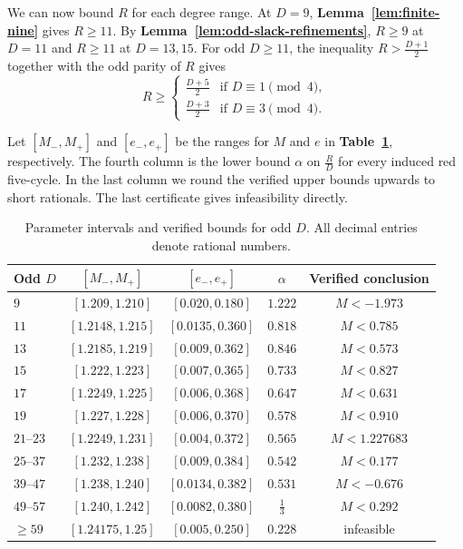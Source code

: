 


We can now bound $R$ for each degree range. At $D=9$,
\textbf{Lemma~\ref{lem:finite-nine}} gives $R\geq11$.
By \textbf{Lemma~\ref{lem:odd-slack-refinements}},
$R\geq9$ at $D=11$ and $R\geq11$ at $D=13,15$.
For odd $D\geq11$, the inequality $R>\frac{D+1}{2}$ together with the
odd parity of $R$ gives
\begin{equation}\label{eq:multi-slack}
 R\geq
 \begin{cases}
 \frac{D+5}{2} & \text{if }D\equiv1\pmod4,\\
 \frac{D+3}{2} & \text{if }D\equiv3\pmod4.
 \end{cases}
\end{equation}

Let $[M_-,M_+]$ and $[e_-,e_+]$ be the ranges for $M$ and $e$
in \textbf{Table~\ref{tab:multi-odd}}, respectively. The fourth
column is the lower bound $\alpha$ on $\frac{R}{D}$ for every induced
red five-cycle. In the last column we round the verified upper bounds
upwards to short rationals. The last certificate gives
infeasibility directly.

\begin{table}[t]
\centering
\small
\begin{tabular}{@{}lcccc@{}}
\toprule
Odd $D$ & $[M_-,M_+]$ & $[e_-,e_+]$ & $\alpha$ & Verified conclusion\\
\midrule
$9$        & $[1.209,1.210]$  & $[0.020,0.180]$   & $1.222$ & $M<-1.973$\\
$11$       & $[1.2148,1.215]$ & $[0.0135,0.360]$  & $0.818$ & $M<0.785$\\
$13$       & $[1.2185,1.219]$ & $[0.009,0.362]$   & $0.846$ & $M<0.573$\\
$15$       & $[1.222,1.223]$  & $[0.007,0.365]$   & $0.733$ & $M<0.827$\\
$17$       & $[1.2249,1.225]$ & $[0.006,0.368]$   & $0.647$ & $M<0.631$\\
$19$       & $[1.227,1.228]$  & $[0.006,0.370]$   & $0.578$ & $M<0.910$\\
$21$--$23$ & $[1.2249,1.231]$ & $[0.004,0.372]$   & $0.565$ & $M<1.227683$\\
$25$--$37$ & $[1.232,1.238]$  & $[0.009,0.384]$   & $0.542$ & $M<0.177$\\
$39$--$47$ & $[1.238,1.240]$  & $[0.0134,0.382]$  & $0.531$ & $M<-0.676$\\
$49$--$57$ & $[1.240,1.242]$  & $[0.0082,0.380]$  & $\frac{1}{3}$ & $M<0.292$\\
$\ge59$    & $[1.24175,1.25]$ & $[0.005,0.250]$   & $0.228$ & infeasible\\
\bottomrule
\end{tabular}
\caption{Parameter intervals and verified bounds for odd $D$. All decimal entries denote rational numbers.}
\label{tab:multi-odd}
\end{table}

